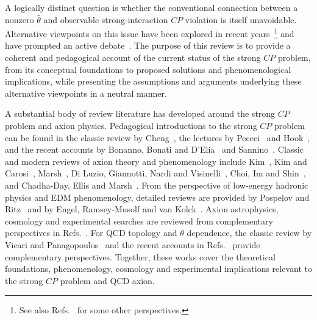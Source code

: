 \documentclass[review]{elsarticle}
\numberwithin{equation}{section}
\numberwithin{table}{section}
\numberwithin{figure}{section}
\begin{document}
A logically distinct question is whether the conventional connection between a nonzero $\bar\theta$ and observable strong-interaction $CP$ violation is itself unavoidable. Alternative viewpoints on this issue have been explored in recent years~\cite{Ai:2020ptm,Nakamura:2021meh,Ai:2022htq,Ai:2024vfa,Schierholz:2024var,Ai:2024cnp,Kaplan:2024ezz,Williams:2026cec}\footnote{See also Refs.~\cite{Torrieri:2020nin,Yamanaka:2022vdt,Yamanaka:2022bfj} for some  other perspectives.} and have prompted an active debate~\cite{Ai:2020ptm,Albandea:2024fui,Ai:2024vfa,Ai:2024cnp,Benabou:2025viy,Ai:2025quf,Khoze:2025auv,Bhattacharya:2025qsk,Ringwald:2026apz,Aghaie:2026pkf,Sannino:2026wgx}. The purpose of this review is to provide a coherent and pedagogical account of the current status of the strong $CP$ problem, from its conceptual foundations to proposed solutions and phenomenological implications, while presenting the assumptions and arguments underlying these alternative viewpoints in a neutral manner.

A substantial body of review literature has developed around the strong $CP$ problem and axion physics. Pedagogical introductions to the strong $CP$ problem can be found in the classic review by Cheng~\cite{Cheng:1987gp}, the lectures by Peccei~\cite{Peccei:2006as} and Hook~\cite{Hook:2018dlk}, and the recent accounts by Bonanno, Bonati and D'Elia~\cite{Bonanno:2025wcv} and Sannino~\cite{Sannino:2026wgx}. Classic and modern reviews of axion theory and phenomenology include Kim~\cite{Kim:1986ax}, Kim and Carosi~\cite{Kim:2008hd}, Marsh~\cite{Marsh:2015xka}, Di Luzio, Giannotti, Nardi and Visinelli~\cite{DiLuzio:2020wdo}, Choi, Im and Shin~\cite{Choi:2020rgn}, and Chadha-Day, Ellis and Marsh~\cite{Chadha-Day:2021szb}. From the perspective of low-energy hadronic physics and EDM phenomenology, detailed reviews are provided by Pospelov and Ritz~\cite{Pospelov:2005pr,Pospelov:2025vzj} and by Engel, Ramsey-Musolf and van Kolck~\cite{Engel:2013lsa}. Axion astrophysics, cosmology and experimental searches are reviewed from complementary perspectives in Refs.~\cite{Raffelt:2006cw,Sikivie:2006ni,Graham:2015ouw,Irastorza:2018dyq,Caputo:2024oqc,OHare:2024nmr,Carenza:2024ehj,Baryakhtar:2025jwh,Cicoli:2026fqp}. For QCD topology and $\theta$ dependence, the classic review by Vicari and Panagopoulos~\cite{Vicari:2008jw} and the recent accounts in Refs.~\cite{Bonanno:2025wcv,Bonanno:2026zzf} provide complementary perspectives. Together, these works cover the theoretical foundations, phenomenology, cosmology and experimental implications relevant to the strong $CP$ problem and QCD axion.
\end{document}
